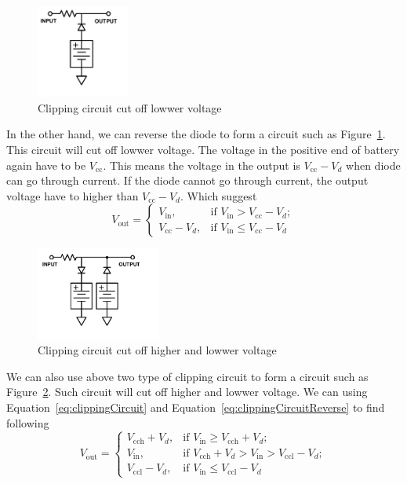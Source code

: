 \documentclass[aps,prl,reprint]{revtex4-1}
\newcommand{\vcc}{V_\text{cc}}
\begin{document}
    \begin{figure}[h]
        \centering
        \includegraphics[height=1.2in]{image/Clipping-Circuit-Reverse.pdf}
        \caption{Clipping circuit cut off lowwer voltage}
        \label{fig:clippingCircuitReverse}
    \end{figure}
    In the other hand, we can reverse the diode to form a circuit such as Figure~\ref{fig:clippingCircuitReverse}. This circuit will cut off lowwer voltage. The voltage in the positive end of battery again have to be $\vcc$. This means the voltage in the output is $\vcc - V_d$ when diode can go through current. If the diode cannot go through current, the output voltage have to higher than $\vcc - V_d$. Which suggest
    \begin{equation}
        V_\text{out} = 
        \begin{cases}
            V_\text{in},    &\text{if } V_\text{in}>\vcc - V_d;\\
            \vcc - V_d,     &\text{if } V_\text{in}\le\vcc - V_d
        \end{cases} \label{eq:clippingCircuitReverse}
    \end{equation}

    \begin{figure}[h]
        \centering
        \includegraphics[height=1.2in]{image/Clipping-Circuit-Dual.pdf}
        \caption{Clipping circuit cut off higher and lowwer voltage}
        \label{fig:clippingCircuitDual}
    \end{figure}
    We can also use above two type of clipping circuit to form a circuit such as Figure~\ref{fig:clippingCircuitDual}. Such circuit will cut off higher and lowwer voltage. We can using Equation~\ref{eq:clippingCircuit} and Equation~\ref{eq:clippingCircuitReverse} to find following 
    \begin{equation}
        V_\text{out} = 
        \begin{cases}
            V_\text{cch} + V_d,     &\text{if } V_\text{in}\ge V_\text{cch} + V_d;\\
            V_\text{in},            &\text{if } V_\text{cch} + V_d>V_\text{in}>V_\text{ccl} - V_d;\\
            V_\text{ccl} - V_d,     &\text{if } V_\text{in}\le V_\text{ccl} - V_d
        \end{cases} \label{eq:clippingCircuitDual}
    \end{equation}
\end{document}
